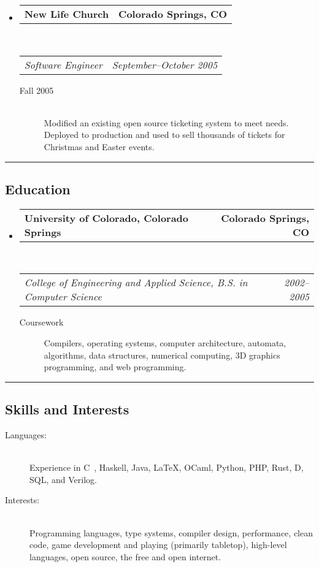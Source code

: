 \documentclass[10pt,letterpaper]{article}
\makeatletter
\newenvironment{indentsection}[1]%
{\begin{list}{}%
  {\setlength{\leftmargin}{#1}}%
  \item[]%
}
{\end{list}}
\newcommand{\headerrow}[2]
{\begin{tabular*}{\linewidth}{l@{\extracolsep{\fill}}r}
  #1 &
  #2 \\
\end{tabular*}}
\newcommand{\CPP}
{C\nolinebreak[4]\hspace{-.05em}\raisebox{.22ex}{\footnotesize\bf ++}}
\makeatother
\begin{document}
\begin{itemize}
  \item
  \headerrow
    {\textbf{New Life Church}}
    {\textbf{Colorado Springs, CO}}
  \\
  \headerrow
    {\emph{Software Engineer}}
    {\emph{September--October 2005}}
  \begin{description}
    \item[Fall 2005] \hfill \\
        Modified an existing open source ticketing system to meet needs. \\
        Deployed to production and used to sell thousands of tickets for Christmas and Easter events.
  \end{description}

\end{itemize}


\hrule
\vspace{-0.4em}
\subsection*{Education}

\begin{itemize}
  \parskip=0.1em

  \item
  \headerrow
    {\textbf{University of Colorado, Colorado Springs}}
    {\textbf{Colorado Springs, CO}}
  \\
  \headerrow
    {\emph{College of Engineering and Applied Science, B.S. in Computer Science}}
    {\emph{2002--2005}}
  \begin{description}
    \item[Coursework] Compilers, operating systems, computer architecture, automata, algorithms, data structures, numerical computing, 3D graphics programming, and web programming.
  \end{description}

\end{itemize}


\hrule
\vspace{-0.4em}
\subsection*{Skills and Interests}

\begin{indentsection}{\parindent}
\begin{description}
  \item[Languages:] \ \\
  Experience in \CPP \ , Haskell, Java, \LaTeX, OCaml, Python, PHP, Rust, D, SQL, and Verilog. \\
  \item[Interests:] \ \\
  Programming languages, type systems, compiler design, performance, clean code, game development and playing (primarily tabletop), high-level languages, open source, the free and open internet.
\end{description}
\end{indentsection}
\end{document}
